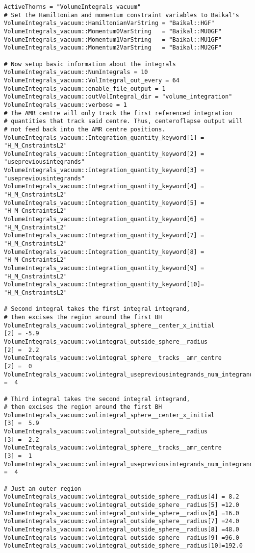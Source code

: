 \begin{verbatim}
ActiveThorns = "VolumeIntegrals_vacuum"
# Set the Hamiltonian and momentum constraint variables to Baikal's
VolumeIntegrals_vacuum::HamiltonianVarString = "Baikal::HGF"
VolumeIntegrals_vacuum::Momentum0VarString   = "Baikal::MU0GF"
VolumeIntegrals_vacuum::Momentum1VarString   = "Baikal::MU1GF"
VolumeIntegrals_vacuum::Momentum2VarString   = "Baikal::MU2GF"

# Now setup basic information about the integrals
VolumeIntegrals_vacuum::NumIntegrals = 10
VolumeIntegrals_vacuum::VolIntegral_out_every = 64
VolumeIntegrals_vacuum::enable_file_output = 1
VolumeIntegrals_vacuum::outVolIntegral_dir = "volume_integration"
VolumeIntegrals_vacuum::verbose = 1
# The AMR centre will only track the first referenced integration
# quantities that track said centre. Thus, centeroflapse output will
# not feed back into the AMR centre positions.
VolumeIntegrals_vacuum::Integration_quantity_keyword[1] = "H_M_CnstraintsL2"
VolumeIntegrals_vacuum::Integration_quantity_keyword[2] = "usepreviousintegrands"
VolumeIntegrals_vacuum::Integration_quantity_keyword[3] = "usepreviousintegrands"
VolumeIntegrals_vacuum::Integration_quantity_keyword[4] = "H_M_CnstraintsL2"
VolumeIntegrals_vacuum::Integration_quantity_keyword[5] = "H_M_CnstraintsL2"
VolumeIntegrals_vacuum::Integration_quantity_keyword[6] = "H_M_CnstraintsL2"
VolumeIntegrals_vacuum::Integration_quantity_keyword[7] = "H_M_CnstraintsL2"
VolumeIntegrals_vacuum::Integration_quantity_keyword[8] = "H_M_CnstraintsL2"
VolumeIntegrals_vacuum::Integration_quantity_keyword[9] = "H_M_CnstraintsL2"
VolumeIntegrals_vacuum::Integration_quantity_keyword[10]= "H_M_CnstraintsL2"

# Second integral takes the first integral integrand,
# then excises the region around the first BH
VolumeIntegrals_vacuum::volintegral_sphere__center_x_initial            [2] = -5.9
VolumeIntegrals_vacuum::volintegral_outside_sphere__radius              [2] =  2.2
VolumeIntegrals_vacuum::volintegral_sphere__tracks__amr_centre          [2] =  0
VolumeIntegrals_vacuum::volintegral_usepreviousintegrands_num_integrands[2] =  4

# Third integral takes the second integral integrand,
# then excises the region around the first BH
VolumeIntegrals_vacuum::volintegral_sphere__center_x_initial            [3] =  5.9
VolumeIntegrals_vacuum::volintegral_outside_sphere__radius              [3] =  2.2
VolumeIntegrals_vacuum::volintegral_sphere__tracks__amr_centre          [3] =  1
VolumeIntegrals_vacuum::volintegral_usepreviousintegrands_num_integrands[3] =  4

# Just an outer region
VolumeIntegrals_vacuum::volintegral_outside_sphere__radius[4] = 8.2
VolumeIntegrals_vacuum::volintegral_outside_sphere__radius[5] =12.0
VolumeIntegrals_vacuum::volintegral_outside_sphere__radius[6] =16.0
VolumeIntegrals_vacuum::volintegral_outside_sphere__radius[7] =24.0
VolumeIntegrals_vacuum::volintegral_outside_sphere__radius[8] =48.0
VolumeIntegrals_vacuum::volintegral_outside_sphere__radius[9] =96.0
VolumeIntegrals_vacuum::volintegral_outside_sphere__radius[10]=192.0
\end{verbatim}


